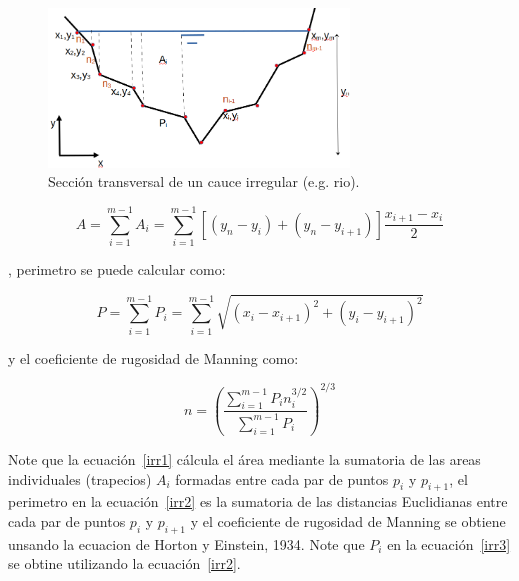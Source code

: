 \documentclass[11pt, oneside]{article}
\begin{document}
\begin{figure}[h!]
\centering
\includegraphics[width=8cm]{irre1.png}
\caption{Secci\'on transversal de un cauce irregular (e.g. rio).}
\label{irre1}
\end{figure}


\begin{equation}
A = \sum_{i=1}^{m-1} A_i = \sum_{i=1}^{m-1} \left[ (y_n - y_i )+(y_n - y_{i+1}) \right] \frac{x_{i+1}-x_i }{2}
\label{irr1}
\end{equation}

, perimetro se puede calcular como:

\begin{equation}
P = \sum_{i=1}^{m-1} P_i = \sum_{i=1}^{m-1} \sqrt{ (x_i - x_{i+1} )^2 + (y_i - y_{i+1})^2 }
\label{irr2}
\end{equation}

y el coeficiente de rugosidad de Manning como:

\begin{equation}
n = \left( \frac{\sum_{i=1}^{m-1} P_i n_i^{3/2}}{\sum_{i=1}^{m-1} P_i} \right)^{2/3}
\label{irr3}
\end{equation}

Note que la ecuaci\'on~\ref{irr1} c\'alcula el \'area mediante la sumatoria de las areas individuales (trapecios) $A_i$ formadas entre cada par de puntos $p_i$ y $p_{i+1}$, el perimetro en la ecuaci\'on~\ref{irr2} es la sumatoria de las distancias Euclidianas entre cada par de puntos $p_i$ y $p_{i+1}$ y el coeficiente de rugosidad de Manning  se obtiene unsando la ecuacion de Horton y Einstein, 1934. Note que $P_i$ en la ecuaci\'on~\ref{irr3} se obtine utilizando la ecuaci\'on~\ref{irr2}.
\end{document}
